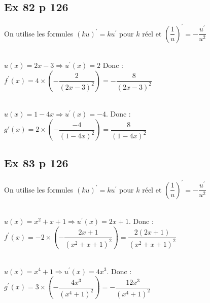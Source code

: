 \documentclass[12pt,a4paper]{book}
\begin{document}
\subsection*{Ex 82 p 126}
On utilise les formules $(k u)^{\prime}=k u^{\prime}$ pour $k$ réel et $\left(\dfrac{1}{u}\right)^{\prime}=-\dfrac{u^{\prime}}{u^{2}}$
\begin{enumMet}
    \item {}\\
    $u(x)=2 x-3 \Rightarrow u^{\prime}(x)=2$
Donc :\\
$f^{\prime}(x)=4 \times\left(-\dfrac{2}{(2 x-3)^{2}}\right)=-\dfrac{8}{(2 x-3)^{2}}$
    \item {}\\
    $u(x)=1-4 x \Rightarrow u^{\prime}(x)=-4$.
Donc :\\
$g'(x)=2 \times\left(-\dfrac{-4}{(1-4 x)^{2}}\right)=\dfrac{8}{(1-4 x)^{2}}$
\end{enumMet}

\subsection*{Ex 83 p 126}
On utilise les formules $(k u)^{\prime}=k u^{\prime}$ pour $k$ réel et $\left(\dfrac{1}{u}\right)^{\prime}=-\dfrac{u^{\prime}}{u^{2}}$
\begin{enumMet}
    \item {}\\
$u(x)=x^{2}+x+1 \Rightarrow u^{\prime}(x)=2 x+1$. Donc : \\
$f^{\prime}(x)=-2 \times\left(-\dfrac{2 x+1}{\left(x^{2}+x+1\right)^{2}}\right)=\dfrac{2(2 x+1)}{\left(x^{2}+x+1\right)^{2}}$
    \item {}\\
$u(x)=x^{4}+1 \Rightarrow u^{\prime}(x)=4 x^{3}$. Donc :\\ 
$g^{\prime}(x)=3 \times\left(-\dfrac{4 x^{3}}{\left(x^{4}+1\right)^{2}}\right)=-\dfrac{12 x^{3}}{\left(x^{4}+1\right)^{2}}$
\end{enumMet}
\end{document}

